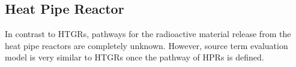 \subsection{Heat Pipe Reactor}
In contrast to HTGRs, pathways for the radioactive material release from the heat pipe reactors are completely unknown. However, source term evaluation model is very similar to HTGRs once the pathway of HPRs is defined.  



